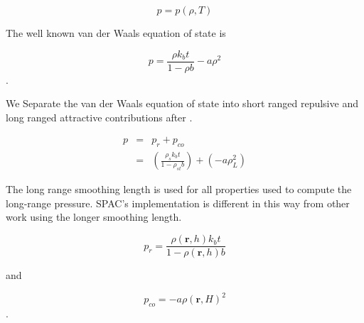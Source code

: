 \begin{equation}
\label{eos}
p = p \left( \rho, T \right)
\end{equation}



The well known van der Waals equation of state is

\begin{equation}
\label{vdw_eos}
p = \frac{\rho k_b t}{1-\rho b} - a \rho^2
\end{equation}.


We Separate the van der Waals equation of state into short ranged repulsive and
long ranged attractive contributions after \cite{nugent_liquid_2000}.

\begin{eqnarray}
\label{vdw_eos_sep}
p & = & p_{r}  + p_{co}  \\
  & = & \left( \frac{\rho_{s} k_{b} t}{1-\rho_{st} b} \right) 
  + \left(- a \rho_{L}^{2} \right) 
\end{eqnarray}

The long range smoothing length is used for all properties used to compute the
long-range pressure. SPAC's implementation is different in this way from other
work using the longer smoothing length.


\begin{equation}
\label{vdw_repulsive}
p_{r} = \frac{\rho\left(\mathbold{r},h\right) k_b t}{1-\rho\left(\mathbold{r},h\right) b} 
\end{equation}

and

\begin{equation}
\label{vdw_cohesive}
p_{co} = - a \rho\left(\mathbold{r},H\right)^{2}
\end{equation}.


